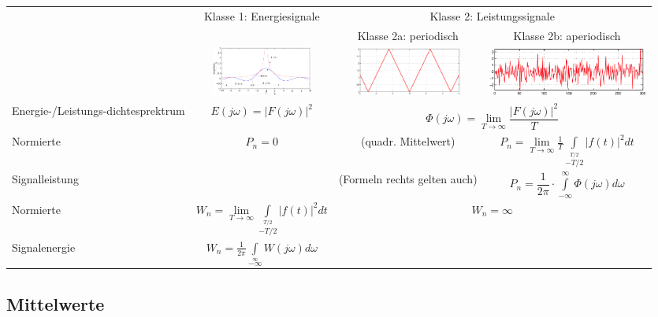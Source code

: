 			\begin{tabularx}{\textwidth}{|p{3.1cm}|c|c|c|}
			\hline
				{}
			&	\multirow{2}{*}{Klasse 1: Energiesignale}
			&	\multicolumn{2}{c|}{Klasse 2: Leistungssignale}
			\\ 
				{}
			&	
			&	Klasse 2a: periodisch
			&	Klasse 2b: aperiodisch
			\\ \hline 
				{}
			&	\includegraphics[width=3.3cm]{./bilder/sinc.png}
			& 	\includegraphics[width=3.5cm]{./bilder/dreieck.png}
			& 	\includegraphics[width=5.29cm]{./bilder/rauschen.png}
			\\ \hline 
				Energie-/Leistungs-dichtesprektrum
			& 	$ E(j \omega) = |F(j \omega)|^2 $
			& 	\multicolumn{2}{c|}{$ \Phi(j\omega) = \lim\limits_{T \to \infty} \dfrac{|F(j\omega)|^2}{T} $}
			\\ \hline 
				Normierte
			& 	$ P_n = 0$
			& 	\formel{$P_n = X^2$} (quadr. Mittelwert)
			& 	$ P_n = \lim\limits_{T \rightarrow \infty} \frac{1}{T} 
									\int\limits_{-T/2}\limits^{T/2} |f(t)|^2 dt $
			\\
				Signalleistung
			&
			& 	(Formeln rechts gelten auch)
			& 	$ P_n = \dfrac{1}{2\pi} \cdot \int\limits_{-\infty}^{\infty} \Phi(j\omega) d\omega $
			\\ \hline
				Normierte
			& 	$ W_n = \lim\limits_{T \rightarrow \infty} \int\limits_{-T/2}\limits^{T/2} |f(t)|^2 dt $
			&	\multicolumn{2}{c|}{$ W_n = \infty $}
			\\
				Signalenergie
			& 	$ W_n = \frac{1}{2 \pi} \int\limits_{-\infty}\limits^{\infty}
									W(j \omega) d\omega $
			&	\multicolumn{2}{c|}{}
			\\ \hline
			\end{tabularx}
				
	\subsection{Mittelwerte }
		
